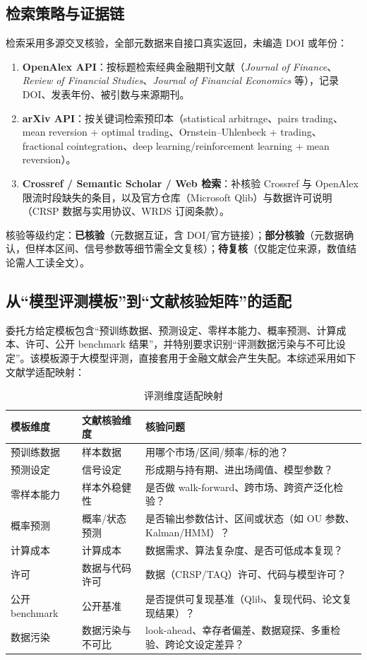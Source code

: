\documentclass[11pt,a4paper]{ctexart}
\begin{document}
\subsection{检索策略与证据链}

检索采用多源交叉核验，全部元数据来自接口真实返回，未编造 DOI 或年份：
\begin{enumerate}
  \item \textbf{OpenAlex API}：按标题检索经典金融期刊文献（\emph{Journal of Finance}、\emph{Review of Financial Studies}、\emph{Journal of Financial Economics} 等），记录 DOI、发表年份、被引数与来源期刊。
  \item \textbf{arXiv API}：按关键词检索预印本（statistical arbitrage、pairs trading、mean reversion + optimal trading、Ornstein--Uhlenbeck + trading、fractional cointegration、deep learning/reinforcement learning + mean reversion）。
  \item \textbf{Crossref / Semantic Scholar / Web 检索}：补核验 Crossref 与 OpenAlex 限流时段缺失的条目，以及官方仓库（Microsoft Qlib）与数据许可说明（CRSP 数据与实用协议、WRDS 订阅条款）。
\end{enumerate}
核验等级约定：\textbf{已核验}（元数据互证，含 DOI/官方链接）；\textbf{部分核验}（元数据确认，但样本区间、信号参数等细节需全文复核）；\textbf{待复核}（仅能定位来源，数值结论需人工读全文）。

\subsection{从“模型评测模板”到“文献核验矩阵”的适配}\label{sec:mapping}

委托方给定模板包含“预训练数据、预测设定、零样本能力、概率预测、计算成本、许可、公开 benchmark 结果”，并特别要求识别“评测数据污染与不可比设定”。该模板源于大模型评测，直接套用于金融文献会产生失配。本综述采用如下文献学适配映射：

\begin{table}[htbp]
\centering
\caption{评测维度适配映射}
\label{tab:mapping}
\begin{tabular}{@{}>{\raggedright\arraybackslash}p{3.2cm}>{\raggedright\arraybackslash}p{3.4cm}>{\raggedright\arraybackslash}p{8.2cm}@{}}
\toprule
模板维度 & 文献核验维度 & 核验问题 \\
\midrule
预训练数据 & 样本数据 & 用哪个市场/区间/频率/标的池？\\
预测设定 & 信号设定 & 形成期与持有期、进出场阈值、模型参数？\\
零样本能力 & 样本外稳健性 & 是否做 walk-forward、跨市场、跨资产泛化检验？\\
概率预测 & 概率/状态预测 & 是否输出参数估计、区间或状态（如 OU 参数、Kalman/HMM）？\\
计算成本 & 计算成本 & 数据需求、算法复杂度、是否可低成本复现？\\
许可 & 数据与代码许可 & 数据（CRSP/TAQ）许可、代码与模型许可？\\
公开 benchmark & 公开基准 & 是否提供可复现基准（Qlib、复现代码、论文复现结果）？\\
数据污染 & 数据污染与不可比 & look-ahead、幸存者偏差、数据窥探、多重检验、跨论文设定差异？\\
\bottomrule
\end{tabular}
\end{table}
\end{document}
